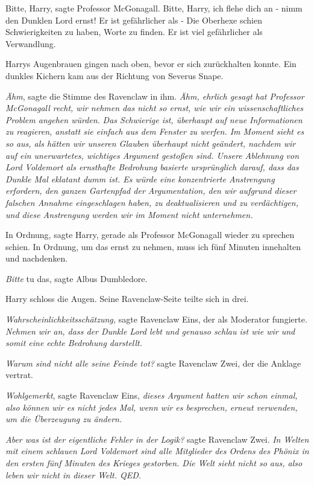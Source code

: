 \glqq Bitte, Harry\grqq{}, sagte Professor McGonagall. \glqq Bitte, Harry, ich
flehe dich an - nimm den Dunklen Lord ernst! Er ist gefährlicher als -\grqq{}
Die Oberhexe schien Schwierigkeiten zu haben, Worte zu finden. \glqq Er ist viel
gefährlicher als Verwandlung.\grqq{}

Harrys Augenbrauen gingen nach oben, bevor er sich zurückhalten konnte. Ein
dunkles Kichern kam aus der Richtung von Severus Snape.

\emph{Ähm}, sagte die Stimme des Ravenclaw in ihm. \emph{Ähm, ehrlich gesagt hat
Professor McGonagall recht, wir nehmen das nicht so ernst, wie wir ein
wissenschaftliches Problem angehen würden.}
\emph{Das Schwierige ist, überhaupt auf neue Informationen zu reagieren, anstatt sie einfach aus dem Fenster zu werfen. Im Moment sieht es so aus, als hätten wir unseren Glauben überhaupt nicht geändert, nachdem wir auf ein unerwartetes, wichtiges Argument gestoßen sind. Unsere Ablehnung von Lord Voldemort als ernsthafte Bedrohung basierte ursprünglich darauf, dass das Dunkle Mal eklatant dumm ist. Es würde eine konzentrierte Anstrengung erfordern, den ganzen Gartenpfad der Argumentation, den wir aufgrund dieser falschen Annahme eingeschlagen haben, zu deaktualisieren und zu verdächtigen, und diese Anstrengung werden wir im Moment nicht unternehmen.}

\glqq In Ordnung\grqq{}, sagte Harry, gerade als Professor McGonagall wieder zu
sprechen schien. \glqq In Ordnung, um das ernst zu nehmen, muss ich fünf Minuten
innehalten und nachdenken.\grqq{}

\glqq \emph{Bitte} tu das\grqq{}, sagte Albus Dumbledore.

Harry schloss die Augen. Seine Ravenclaw-Seite teilte sich in drei.

\emph{Wahrscheinlichkeitsschätzung,} sagte Ravenclaw Eins, der als Moderator
fungierte. \emph{Nehmen wir an, dass der Dunkle Lord lebt und genauso schlau ist
wie wir und somit eine echte Bedrohung darstellt.}

\emph{Warum sind nicht alle seine Feinde tot? }sagte Ravenclaw Zwei, der die
Anklage vertrat.

\emph{Wohlgemerkt}, sagte Ravenclaw Eins, \emph{dieses Argument hatten wir schon
einmal, also können wir es nicht jedes Mal, wenn wir es besprechen, erneut
verwenden, um die Überzeugung zu ändern.}

\emph{Aber was ist der eigentliche Fehler in der Logik?} sagte Ravenclaw Zwei.
\emph{In Welten mit einem schlauen Lord Voldemort sind alle Mitglieder des
Ordens des Phönix in den ersten fünf Minuten des Krieges gestorben. Die Welt
sieht nicht so aus, also leben wir nicht in dieser Welt. QED.}

